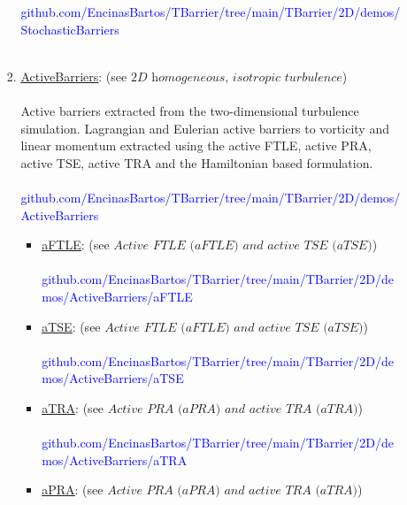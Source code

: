 \documentclass{article}
\begin{document}
\begin{enumerate}
\begin{enumerate}
\begin{enumerate}
\textcolor{blue}{{\footnotesize github.com/EncinasBartos/TBarrier/tree/main/TBarrier/2D/demos/StochasticBarriers}} \\ \\
\item \href{https://github.com/EncinasBartos/TBarrier/tree/main/TBarrier/2D/demos/ActiveBarriers}{\underline{ActiveBarriers}}: (see $ \textit{2D homogeneous, isotropic turbulence} $)\\ \\
Active barriers extracted from the two-dimensional turbulence simulation. Lagrangian and Eulerian active barriers to vorticity and linear momentum extracted using the active FTLE, active PRA, active TSE, active TRA and the Hamiltonian based formulation. \\ \\
\textcolor{blue}{{\footnotesize github.com/EncinasBartos/TBarrier/tree/main/TBarrier/2D/demos/ActiveBarriers}} \\ 
\begin{itemize}
\item \href{https://github.com/EncinasBartos/TBarrier/tree/main/TBarrier/2D/demos/ActiveBarriers/aFTLE}{\underline{aFTLE}}: (see $ \textit{Active FTLE (aFTLE) and active TSE (aTSE)} $) \\ \\
\textcolor{blue}{{\footnotesize github.com/EncinasBartos/TBarrier/tree/main/TBarrier/2D/demos/ActiveBarriers/aFTLE}} \\
\item \href{https://github.com/EncinasBartos/TBarrier/tree/main/TBarrier/2D/demos/ActiveBarriers/aTSE}{\underline{aTSE}}: (see $ \textit{Active FTLE (aFTLE) and active TSE (aTSE)} $) \\ \\
\textcolor{blue}{{\footnotesize github.com/EncinasBartos/TBarrier/tree/main/TBarrier/2D/demos/ActiveBarriers/aTSE}} \\ 
\item \href{https://github.com/EncinasBartos/TBarrier/tree/main/TBarrier/2D/demos/ActiveBarriers/aTRA}{\underline{aTRA}}: (see $ \textit{Active PRA (aPRA) and active TRA (aTRA)} $) \\ \\ 
\textcolor{blue}{{\footnotesize github.com/EncinasBartos/TBarrier/tree/main/TBarrier/2D/demos/ActiveBarriers/aTRA}} \\ 
\item \href{https://github.com/EncinasBartos/TBarrier/tree/main/TBarrier/2D/demos/ActiveBarriers/aPRA}{\underline{aPRA}}: (see $ \textit{Active PRA (aPRA) and active TRA (aTRA)} $) \\ \\

\end{itemize}
\end{enumerate}
\end{enumerate}
\end{enumerate}
\end{document}
